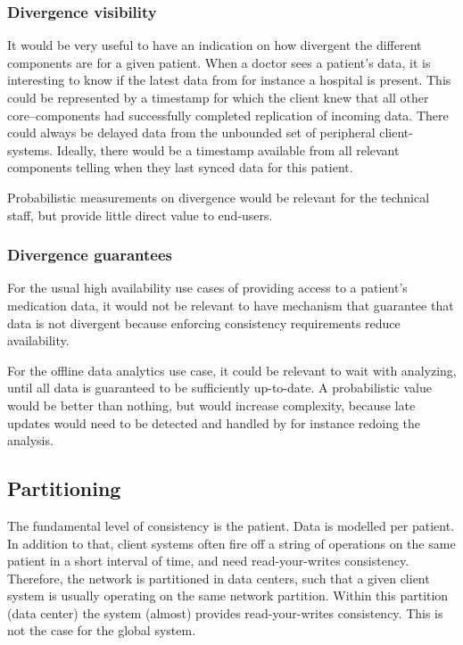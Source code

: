 \documentclass[11pt,a4paper]{report}
\begin{document}
\subsubsection{Divergence visibility}
It would be very useful to have an indication on how divergent the different components are for a given patient. When a doctor sees a patient's data, it is interesting to know if the latest data from for instance a hospital is present.
This could be represented by a timestamp for which the client knew that all other core--components had successfully completed replication of incoming data. 
There could always be delayed data from the unbounded set of peripheral client-systems. Ideally, there would be a timestamp available from all relevant components telling when they last synced data for this patient.

Probabilistic measurements on divergence would be relevant for the technical staff, but provide little direct value to end-users.

\subsubsection{Divergence guarantees}
For the usual high availability use cases of providing access to a patient's medication data, it would not be relevant to have mechanism that guarantee that data is not divergent because enforcing consistency requirements reduce availability.

For the offline data analytics use case, it could be relevant to wait with analyzing, until all data is guaranteed to be sufficiently up-to-date. A probabilistic value would be better than nothing, but would increase complexity, because late updates would need to be detected and handled by for instance redoing the analysis.

\subsection{Partitioning}
The fundamental level of consistency is the patient. Data is modelled per patient. 
In addition to that, client systems often fire off a string of operations on the same patient in a short interval of time, and need read-your-writes consistency. Therefore, the network is partitioned in data centers, such that a given client system is usually operating on the same network partition. Within this partition (data center) the system (almost) provides read-your-writes consistency. This is not the case for the global system.
\end{document}
